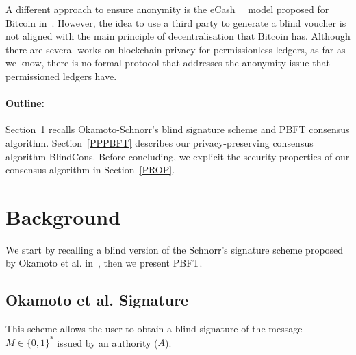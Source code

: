 \documentclass[conference]{IEEEtran}
\newcommand{\name}{BlindCons}
\begin{document}
A different approach to ensure anonymity is the eCash~\cite{chaum1983blind}~\cite{chaum1988untraceable} model proposed for Bitcoin in~\cite{heilman2016blindly}. However, the idea to use a third party to generate a blind voucher is not aligned with the main principle of decentralisation that Bitcoin has. Although there are several works on blockchain privacy for permissionless ledgers, as far as we know, there is no formal protocol that addresses the anonymity issue that permissioned ledgers have.

\paragraph*{Outline:}  Section~\ref{back} recalls  Okamoto-Schnorr's blind signature scheme and PBFT consensus algorithm. Section~\ref{PPPBFT} describes our privacy-preserving consensus algorithm \name{}. Before concluding, we explicit the security properties of our consensus algorithm in Section~\ref{PROP}.


\section{Background} \label{back}

We start by recalling a blind version of the Schnorr's signature scheme proposed by Okamoto et al. in~\cite{okamoto1992provably}, then we present PBFT.

\subsection{Okamoto et al. Signature}
\label{Okamoto}

This scheme allows the user to obtain a blind signature of the message $M\in \{0,1\}^*$ issued by an authority ($A$). 
\end{document}
